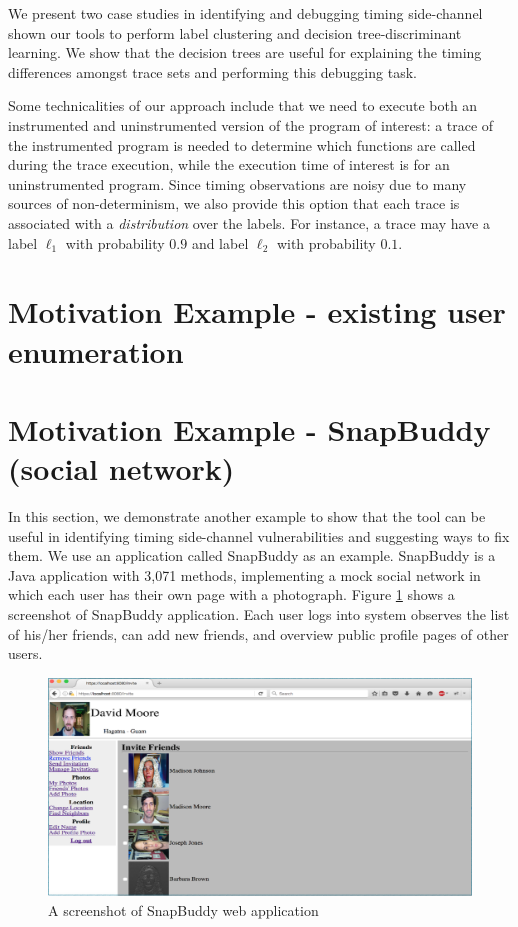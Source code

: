 \documentclass{article}
\begin{document}
We present two case studies in identifying and debugging timing
side-channel shown our tools to
perform label clustering and decision tree-discriminant learning. We show that
the decision trees are useful for explaining the timing
differences amongst trace sets and performing this debugging task.

Some technicalities of our approach include that we need to execute both an
instrumented and uninstrumented version of the program of interest: a trace of
the instrumented program is needed to determine which functions are called during
the trace execution, while the execution time of interest is for an uninstrumented
program. Since timing observations are noisy due to many sources of
non-determinism, we also provide this option that each trace is associated with a
\emph{distribution} over the labels.
For instance, a trace may have a label $\ell_1$ with probability $0.9$
and label $\ell_2$ with probability $0.1$.

\section{Motivation Example - existing user enumeration}


\section{Motivation Example - SnapBuddy (social network)}
In this section, we demonstrate another example to show that the tool can be useful in
identifying timing side-channel vulnerabilities
and suggesting ways to fix them.
We use an application called
SnapBuddy as an example. SnapBuddy is a Java application with 3,071 methods,
implementing a mock social network in which
each user has their own page with a photograph. Figure \ref{snapbuddy-1} shows
a screenshot of SnapBuddy application. Each user logs into system observes the
list of his/her friends, can add new friends, and overview public profile pages of
other users. 

\begin{figure}[t]
    \centering
    \includegraphics[width=1\textwidth]{snapbuddy-1}
    \caption{A screenshot of SnapBuddy web application}
    \label{snapbuddy-1}
\end{figure}
\end{document}
